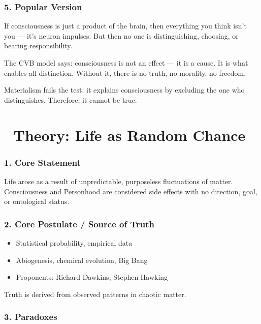\documentclass[12pt]{article}
\begin{document}
\subsubsection*{5. Popular Version}

If consciousness is just a product of the brain, then everything you think isn’t you — it’s neuron impulses. But then no one is distinguishing, choosing, or bearing responsibility.

The CVB model says: consciousness is not an effect — it is a cause. It is what enables all distinction. Without it, there is no truth, no morality, no freedom.

Materialism fails the test: it explains consciousness by excluding the one who distinguishes. Therefore, it cannot be true.


\section*{🔷 Theory: Life as Random Chance}

\subsubsection*{1. Core Statement}

Life arose as a result of unpredictable, purposeless fluctuations of matter. Consciousness and Personhood are considered side effects with no direction, goal, or ontological status.

\subsubsection*{2. Core Postulate / Source of Truth}

\begin{itemize}
\item Statistical probability, empirical data
\item Abiogenesis, chemical evolution, Big Bang
\item Proponents: Richard Dawkins, Stephen Hawking
\end{itemize}

Truth is derived from observed patterns in chaotic matter.

\subsubsection*{3. Paradoxes}
\end{document}

